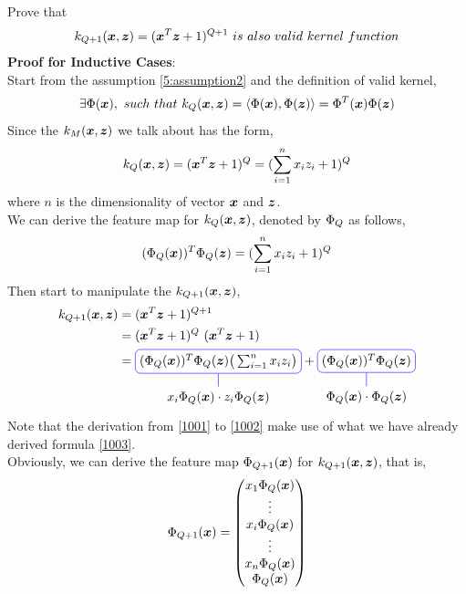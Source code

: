 \documentclass[11pt,a4paper]{article}
\newcommand{\htab}{\hspace*{0.63cm}}
\begin{document}
\htab Prove that 
    \begin{align} \label{5:inductive2}
        \kpnew = (\xx^{T}\zz + 1)^{Q+1}\ is\ also\ valid\ kernel\ function
    \end{align}
\htab \textbf{Proof for Inductive Cases}: \\
\htab Start from the assumption \eqref{5:assumption2} and the definition of valid kernel,
    \begin{align}
        \exists \Phi(\boldsymbol{x}),\ such\ that\ k_{Q}(\boldsymbol{x},\boldsymbol{z}) = \langle \Phi(\boldsymbol{x}), \Phi(\boldsymbol{z}) \rangle 
        = \Phi^{T}(\boldsymbol{x}) \Phi(\boldsymbol{z})
    \end{align}
\htab Since the $k_{M}(\boldsymbol{x},\boldsymbol{z})$ we talk about has the form,
    \begin{align}
        k_{Q}(\boldsymbol{x},\boldsymbol{z}) = (\boldsymbol{x}^{T}\boldsymbol{z} + 1)^{Q} = (\sum_{i=1}^{n} x_{i} z_{i} + 1)^{Q}
    \end{align}
    \htab where $n$ is the dimensionality of vector $\boldsymbol{x}$ and $\boldsymbol{z}$. \\[0.1cm]
\htab We can derive the feature map for $k_{Q}(\boldsymbol{x},\boldsymbol{z})$, denoted by $\Phi_{Q}$ as follows,
    \begin{align}
        (\Phi_{Q}(\boldsymbol{x}))^{T} \Phi_{Q}(\boldsymbol{z}) = (\sum_{i=1}^{n} x_{i} z_{i} + 1)^{Q} \label{1003}
    \end{align}
\htab Then start to manipulate the $k_{Q+1}(\boldsymbol{x},\boldsymbol{z})$,
    \begin{align}
        \kpnew &= (\xx^{T}\zz + 1)^{Q+1} \\
               &= (\xx^{T}\zz + 1)^{Q}\ (\xx^{T}\zz + 1) \label{1001} \\
        &= 
        \tikz[baseline]{ \node[draw=blue,rounded corners,anchor=base] (m15) 
            {$(\PhiQ(\xx))^{T} \PhiQ(\zz) \big(\sumxzn\big)$} ;
        \node[below of=m15] (l15) {$x_{i} \PhiQ(\xx) \cdot z_{i} \PhiQ(\zz)$};
        \draw[-,blue] (l15) -- (m15);
        } + 
        \tikz[baseline]{ \node[draw=blue,rounded corners,anchor=base] (m16) 
            {$(\PhiQ(\xx))^{T} \PhiQ(\zz)$} ;
        \node[below of=m16] (l16) {$\PhiQ(\xx) \cdot \PhiQ(\zz)$};
        \draw[-,blue] (l16) -- (m16);
    }  \label{1002}
    \end{align}
\htab Note that the derivation from \eqref{1001} to \eqref{1002} make use of what we 
have already derived formula \eqref{1003}. \\
\htab Obviously, we can derive the feature map $\Phi_{Q+1}(\boldsymbol{x})$ for $k_{Q+1}(\boldsymbol{x},\boldsymbol{z})$, that is,
    \begin{align}
        \Phi_{Q+1} (\boldsymbol{x})= 
        \begin{pmatrix} 
            x_{1} \Phi_{Q}(\boldsymbol{x}) \\
            \vdots \\
            x_{i} \Phi_{Q}(\boldsymbol{x}) \\
            \vdots \\
            x_{n} \Phi_{Q}(\boldsymbol{x}) \\
            \Phi_{Q}(\boldsymbol{x})     
        \end{pmatrix} \label{1004}
    \end{align}
\end{document}

